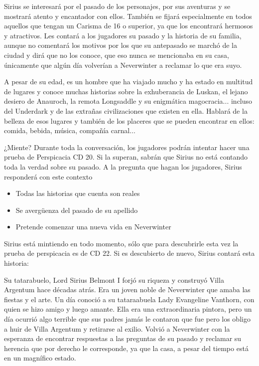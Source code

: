 \documentclass[10pt,twoside,twocolumn,openany]{dndbook}
\begin{document}
Sirius se interesará por el pasado de los personajes, por sus aventuras y se mostrará atento y 
encantador con ellos. También se fijará especialmente en todos aquellos que tengan un Carisma 
de 16 o superior, ya que los encontrará hermosos y atractivos. Les contará a los jugadores su 
pasado y la historia de su familia, aunque no comentará los motivos por los que su antepasado 
se marchó de la ciudad y dirá que no los conoce, que eso nunca se mencionaba en su casa, 
únicamente que algún día volverían a Neverwinter a reclamar lo que era suyo.

A pesar de su edad, es un hombre que ha viajado mucho y ha estado en multitud de lugares y conoce 
muchas historias sobre la exhuberancia de Luskan, el lejano desiero de Anauroch, 
la remota Longsaddle y su enigmática magocracia... incluso del Underdark y de las extrañas 
civilizaciones que existen en ella. Hablará de la belleza de esos lugares y también de los 
placeres que se pueden encontrar en ellos: comida, bebida, música, compañía carnal... 

\begin{DndComment}{¿Miente?}
  Durante toda la conversación, los jugadores podrán intentar hacer una prueba de Perspicacia CD 20. 
  Si la superan, sabrán que Sirius no está contando toda la verdad sobre su pasado. A la pregunta
  que hagan los jugadores, Sirius responderá con este contexto

\begin{itemize}
  \item Todas las historias que cuenta son reales
  \item Se avergüenza del pasado de su apellido
  \item Pretende comenzar una nueva vida en Neverwinter
\end{itemize}
\end{DndComment}

Sirius está mintiendo en todo momento, sólo que para descubrirle esta vez la prueba de perspicacia es de 
CD 22. Si es descubierto de nuevo, Sirius contará esta historia:

\begin{DndReadAloud}
Su tatarabuelo, Lord Sirius Belmont I forjó su riqueza y construyó Villa Argentum hace décadas atrás.
Era un joven noble de Neverwinter que amaba las fiestas y el arte. Un día conoció a su tataraabuela
Lady Evangeline Vanthorn, con quien se hizo amigo y luego amante. Ella era una extraordinaria 
pintora, pero un día ocurrió algo terrible que sus padres jamás le contaron que fue pero los obligo
a huir de Villa Argentum y retirarse al exilio. Volvió a Neverwinter con la esperanza de encontrar
respuestas a las preguntas de su pasado y reclamar su herencia que por derecho le corresponde, ya
que la casa, a pesar del tiempo está en un magnífico estado.
\end{DndReadAloud}
\end{document}
